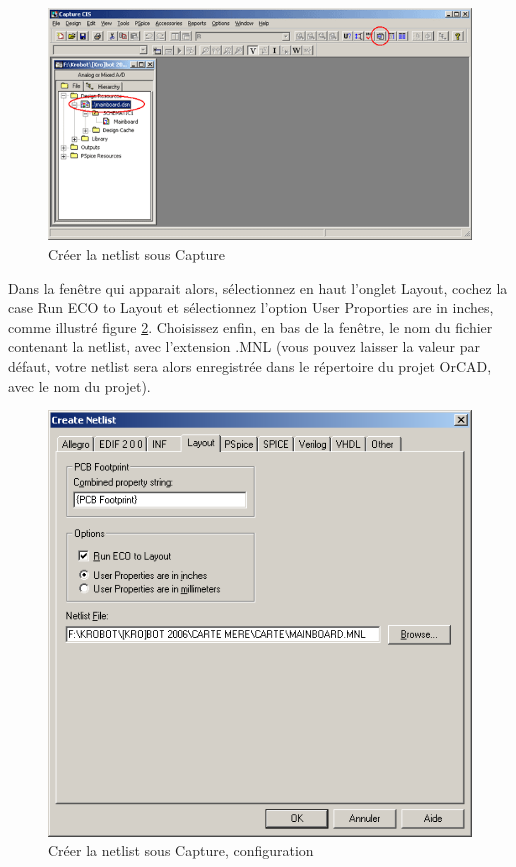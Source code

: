 \documentclass[a4paper]{article}
\begin{document}
\begin{figure}[H]
	\centering
	\includegraphics[scale=0.75]{Images/Creer_netlist_OrCAD.png}
	\caption{Créer la netlist sous Capture
		\label{Creer_netlist_OrCAD}}
\end{figure}

Dans la fenêtre qui apparait alors, sélectionnez en haut l'onglet \og{}Layout\fg{}, cochez la case \og{}Run ECO to Layout\fg{} et sélectionnez l'option \og{}User Proporties are in inches\fg{}, comme illustré figure \ref{Creer_netlist_OrCAD_options}. Choisissez enfin, en bas de la fenêtre, le nom du fichier contenant la netlist, avec l'extension \og{}.MNL\fg{} (vous pouvez laisser la valeur par défaut, votre netlist sera alors enregistrée dans le répertoire du projet OrCAD, avec le nom du projet).

\begin{figure}[H]
	\centering
	\includegraphics[scale=0.75]{Images/Creer_netlist_OrCAD_options.png}
	\caption{Créer la netlist sous Capture, configuration
		\label{Creer_netlist_OrCAD_options}}
\end{figure}
\end{document}
